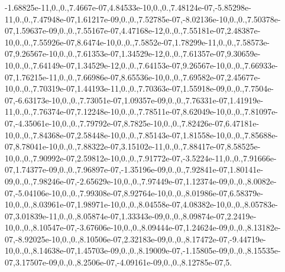 {-\/1.\-68825e-\/11,0.,0.,7.\-4667e-\/07,4.\-84533e-\/10,0.,0.,7.\-48124e-\/07,-\/5.\-85298e-\/11,0.,0.,7.\-47948e-\/07,1.\-61217e-\/09,0.,0.,7.\-52785e-\/07,-\/8.\-02136e-\/10,0.,0.,7.\-50378e-\/07,1.\-59637e-\/09,0.,0.,7.\-55167e-\/07,4.\-47168e-\/12,0.,0.,7.\-55181e-\/07,2.\-48387e-\/10,0.,0.,7.\-55926e-\/07,8.\-6474e-\/10,0.,0.,7.\-5852e-\/07,1.\-78299e-\/11,0.,0.,7.\-58573e-\/07,9.\-26567e-\/10,0.,0.,7.\-61353e-\/07,1.\-34529e-\/12,0.,0.,7.\-61357e-\/07,9.\-30659e-\/10,0.,0.,7.\-64149e-\/07,1.\-34529e-\/12,0.,0.,7.\-64153e-\/07,9.\-26567e-\/10,0.,0.,7.\-66933e-\/07,1.\-76215e-\/11,0.,0.,7.\-66986e-\/07,8.\-65536e-\/10,0.,0.,7.\-69582e-\/07,2.\-45677e-\/10,0.,0.,7.\-70319e-\/07,1.\-44193e-\/11,0.,0.,7.\-70363e-\/07,1.\-55918e-\/09,0.,0.,7.\-7504e-\/07,-\/6.\-63173e-\/10,0.,0.,7.\-73051e-\/07,1.\-09357e-\/09,0.,0.,7.\-76331e-\/07,1.\-41919e-\/11,0.,0.,7.\-76374e-\/07,7.\-12248e-\/10,0.,0.,7.\-78511e-\/07,8.\-62049e-\/10,0.,0.,7.\-81097e-\/07,-\/4.\-35061e-\/10,0.,0.,7.\-79792e-\/07,8.\-7825e-\/10,0.,0.,7.\-82426e-\/07,6.\-47181e-\/10,0.,0.,7.\-84368e-\/07,2.\-58448e-\/10,0.,0.,7.\-85143e-\/07,1.\-81558e-\/10,0.,0.,7.\-85688e-\/07,8.\-78041e-\/10,0.,0.,7.\-88322e-\/07,3.\-15102e-\/11,0.,0.,7.\-88417e-\/07,8.\-58525e-\/10,0.,0.,7.\-90992e-\/07,2.\-59812e-\/10,0.,0.,7.\-91772e-\/07,-\/3.\-5224e-\/11,0.,0.,7.\-91666e-\/07,1.\-74377e-\/09,0.,0.,7.\-96897e-\/07,-\/1.\-35196e-\/09,0.,0.,7.\-92841e-\/07,1.\-80141e-\/09,0.,0.,7.\-98246e-\/07,-\/2.\-65629e-\/10,0.,0.,7.\-97449e-\/07,1.\-12374e-\/09,0.,0.,8.\-0082e-\/07,-\/5.\-04106e-\/10,0.,0.,7.\-99308e-\/07,8.\-92764e-\/10,0.,0.,8.\-01986e-\/07,6.\-58379e-\/10,0.,0.,8.\-03961e-\/07,1.\-98971e-\/10,0.,0.,8.\-04558e-\/07,4.\-08382e-\/10,0.,0.,8.\-05783e-\/07,3.\-01839e-\/11,0.,0.,8.\-05874e-\/07,1.\-33343e-\/09,0.,0.,8.\-09874e-\/07,2.\-2419e-\/10,0.,0.,8.\-10547e-\/07,-\/3.\-67606e-\/10,0.,0.,8.\-09444e-\/07,1.\-24624e-\/09,0.,0.,8.\-13182e-\/07,-\/8.\-92025e-\/10,0.,0.,8.\-10506e-\/07,2.\-32183e-\/09,0.,0.,8.\-17472e-\/07,-\/9.\-44719e-\/10,0.,0.,8.\-14638e-\/07,1.\-45703e-\/09,0.,0.,8.\-19009e-\/07,-\/1.\-15805e-\/09,0.,0.,8.\-15535e-\/07,3.\-17507e-\/09,0.,0.,8.\-2506e-\/07,-\/4.\-09161e-\/09,0.,0.,8.\-12785e-\/07,5.}
